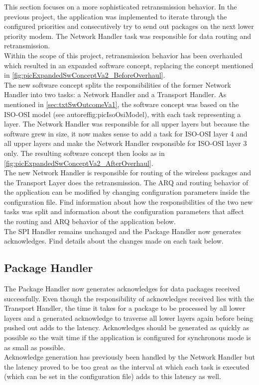 This section focuses on a more sophisticated retransmission behavior. In the previous project, the application was implemented to iterate through the configured priorities and consecutively try to send out packages on the next lower priority modem. The Network Handler task was responsible for data routing and retransmission.\\
Within the scope of this project, retransmission behavior has been overhauled which resulted in an expanded software concept, replacing the concept mentioned in \autoref{fig:picExpandedSwConceptVa2_BeforeOverhaul}.\\ 
The new software concept splits the responsibilities of the former Network Handler into two tasks: a Network Handler and a Transport Handler. As mentioned in \autoref{sec:txtSwOutcomeVa1}, the software concept was based on the ISO-OSI model (see autoref{fig:picIsoOsiModel}), with each task representing a layer. The Network Handler was responsible for all upper layers but because the software grew in size, it now makes sense to add a task for ISO-OSI layer 4 and all upper layers and make the Network Handler responsible for ISO-OSI layer 3 only. The resulting software concept then looks as in \autoref{fig:picExpandedSwConceptVa2_AfterOverhaul}.\\
The new Network Handler is responsible for routing of the wireless packages and the Transport Layer does the retransmission. The ARQ and routing behavior of the application can be modified by changing configuration parameters inside the configuration file. Find information about how the responsibilities of the two new tasks was split and information about the configuration parameters that affect the routing and ARQ behavior of the application below.\\
The SPI Handler remains unchanged and the Package Handler now generates acknowledges. Find details about the changes made on each task below.
%
\subsection{Package Handler}
The Package Handler now generates acknowledges for data packages received successfully. Even though the responsibility of acknowledges received lies with the Transport Handler, the time it takes for a package to be processed by all lower layers and a generated acknowledge to traverse all lower layers again before being pushed out adds to the latency. Acknowledges should be generated as quickly as possible so the wait time if the application is configured for synchronous mode is as small as possible.\\
Acknowledge generation has previously been handled by the Network Handler but the latency proved to be too great as the interval at which each task is executed (which can be set in the configuration file) adds to this latency as well.
%
